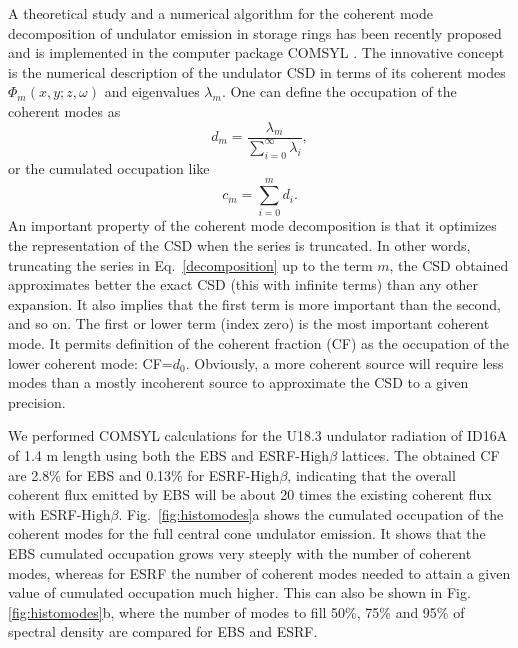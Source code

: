 \documentclass{iucr}              %
\begin{document}
A theoretical study and a numerical algorithm for the coherent mode decomposition of undulator emission in storage rings has been recently proposed  \cite{GlassThesis,GlassEPL} and is implemented in the computer package COMSYL \cite{codeCOMSYL}. The innovative concept is the numerical description of the undulator CSD in terms of its coherent modes $\Phi_m(x,y;z,\omega)$ and eigenvalues $\lambda_m $. One can define the occupation of the coherent modes as
\begin{equation}
 d_m = \frac{\lambda_m}{\sum\limits_{i=0}^{\infty} \lambda_i},
\end{equation}
or the cumulated occupation like
\begin{equation}
 c_m = \sum\limits_{i=0}^{m} d_i.
\end{equation}
An important property of the coherent mode decomposition is that it optimizes the representation of the CSD when the series is truncated. In other words, truncating the series in Eq.~\ref{decomposition} up to the term $m$, the CSD obtained approximates better the exact CSD (this with infinite terms) than any other expansion. It also implies that the first term is more important than the second, and so on. The first or lower term (index zero) is the most important coherent mode. It permits definition of the coherent fraction (CF) as the occupation of the lower coherent mode: CF=$d_0$. Obviously, a more coherent source will require less modes than a mostly incoherent source to approximate the CSD to a given precision.

We performed COMSYL calculations for the U18.3 undulator radiation of ID16A of 1.4 m length using both the EBS and ESRF-High$\beta$ lattices. The obtained CF are 2.8\% for EBS and 0.13\% for ESRF-High$\beta$, indicating that the overall coherent flux emitted by EBS will be about 20 times the existing coherent flux with ESRF-High$\beta$. Fig.~\ref{fig:histomodes}a shows the cumulated occupation of the coherent modes for the full central cone undulator emission. It shows that the EBS cumulated occupation grows very steeply with the number of coherent modes, whereas for ESRF the number of coherent modes needed to attain a given value of cumulated occupation much higher. This can also be shown in Fig.\ref{fig:histomodes}b, where the number of modes to fill 50\%, 75\% and 95\% of spectral density are compared for EBS and ESRF.   
\end{document}
